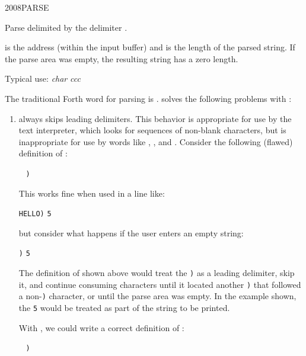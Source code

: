 \begin{worddef}{2008}{PARSE}
\item {}

	Parse  delimited by the delimiter .

	 is the address (within the input buffer) and
	 is the length of the parsed string. If the parse area
	was empty, the resulting string has a zero length.


	\begin{rationale} %
		Typical use: \emph{char}  \emph{ccc}

		The traditional Forth word for parsing is .
		 solves the following problems with :

		\begin{enumerate}
		\item {} always skips leading delimiters. This
			behavior is appropriate for use by the text interpreter,
			which looks for sequences of non-blank characters, but is
			inappropriate for use by words like  , ,
			and . Consider the following (flawed) definition
			of :

			\tab \word{:}  ~
				\word{[CHAR]} \texttt{)} ~
				  
			\word{;} ~ 

			This works fine when used in a line like:

			\tab {} \texttt{HELLO)} \quad \texttt{5} 

			but consider what happens if the user enters an empty
			string:

			\tab {} \texttt{)} \quad \texttt{5} 

			The definition of  shown above would treat the
			\texttt{)} as a leading delimiter, skip it, and continue
			consuming characters until it located another \texttt{)}
			that followed a non-\texttt{)} character, or until the
			parse area was empty. In the example shown, the
			\texttt{5} 
			would be treated as part of the string to be printed.

			With , we could write a correct definition of
			:

			\tab \word{:}  ~
				\word{[CHAR]} \texttt{)} ~
				 
			\word{;} ~ 


\end{enumerate}
\end{rationale}
\end{worddef}
